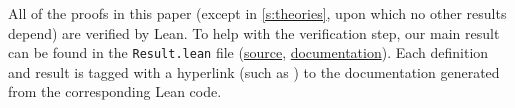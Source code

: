 All of the proofs in this paper (except in \cref{s:theories}, upon which no other results depend) are verified by Lean.
To help with the verification step, our main result can be found in the \texttt{Result.lean} file (\href{https://github.com/leanprover-community/con-nf/blob/main/ConNF/Model/Result.lean}{source}, \href{https://leanprover-community.github.io/con-nf/doc/ConNF/Model/Result.html}{documentation}).
Each definition and result is tagged with a hyperlink (such as ) to the documentation generated from the corresponding Lean code.
